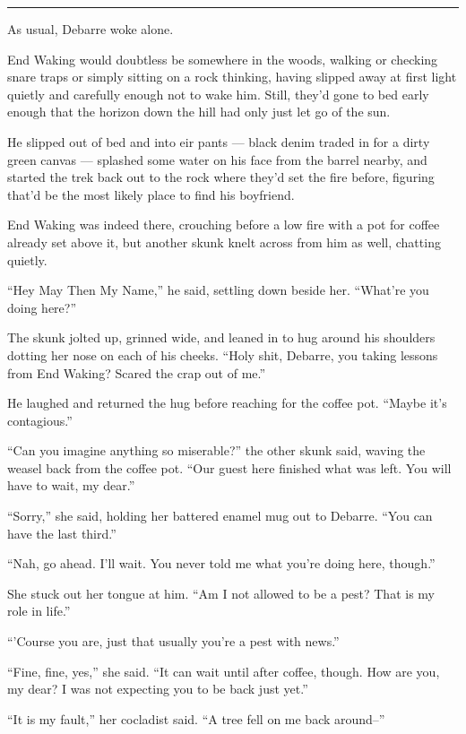 \begin{center}\rule{0.5\linewidth}{0.5pt}\end{center}

As usual, Debarre woke alone.

End Waking would doubtless be somewhere in the woods, walking or checking snare traps or simply sitting on a rock thinking, having slipped away at first light quietly and carefully enough not to wake him. Still, they'd gone to bed early enough that the horizon down the hill had only just let go of the sun.

He slipped out of bed and into eir pants — black denim traded in for a dirty green canvas — splashed some water on his face from the barrel nearby, and started the trek back out to the rock where they'd set the fire before, figuring that'd be the most likely place to find his boyfriend.

End Waking was indeed there, crouching before a low fire with a pot for coffee already set above it, but another skunk knelt across from him as well, chatting quietly.

``Hey May Then My Name,'' he said, settling down beside her. ``What're you doing here?''

The skunk jolted up, grinned wide, and leaned in to hug around his shoulders dotting her nose on each of his cheeks. ``Holy shit, Debarre, you taking lessons from End Waking? Scared the crap out of me.''

He laughed and returned the hug before reaching for the coffee pot. ``Maybe it's contagious.''

``Can you imagine anything so miserable?'' the other skunk said, waving the weasel back from the coffee pot. ``Our guest here finished what was left. You will have to wait, my dear.''

``Sorry,'' she said, holding her battered enamel mug out to Debarre. ``You can have the last third.''

``Nah, go ahead. I'll wait. You never told me what you're doing here, though.''

She stuck out her tongue at him. ``Am I not allowed to be a pest? That is my role in life.''

``'Course you are, just that usually you're a pest with news.''

``Fine, fine, yes,'' she said. ``It can wait until after coffee, though. How are you, my dear? I was not expecting you to be back just yet.''

``It is my fault,'' her cocladist said. ``A tree fell on me back around--''

